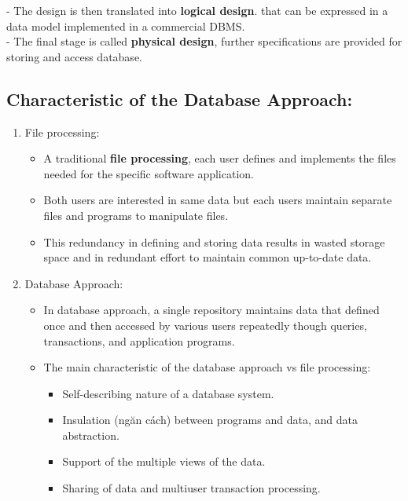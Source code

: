 \documentclass[10pt]{article}
\begin{document}
	- The design is then translated into \textbf{logical design}. that can be expressed in a data model implemented in a commercial DBMS. \\

	- The final stage is called \textbf{physical design}, further specifications are provided for storing and access database. \\

\subsection{Characteristic of the Database Approach: }
\begin{enumerate}
	\item File processing:
	\begin{itemize}
		\item A traditional \textbf{file processing}, each user defines and implements the files needed for the specific software application.
		\item Both users are interested in same data but each users maintain separate files and programs to manipulate files.
		\item This redundancy in defining and storing data results in wasted storage space and in redundant effort to maintain common up-to-date data.
	\end{itemize}

	\item Database Approach:
	\begin{itemize}
		\item In database approach, a single repository maintains data that defined once and then accessed by various users repeatedly though queries, transactions, and application programs.
		\item The main characteristic of the database approach vs file processing:
		\begin{itemize}
			\item Self-describing nature of a database system.
			\item Insulation (ngăn cách) between programs and data, and data abstraction.
			\item Support of the multiple views of the data.
			\item Sharing of data and multiuser transaction processing.
		\end{itemize}
	\end{itemize}


\end{enumerate}
\end{document}
